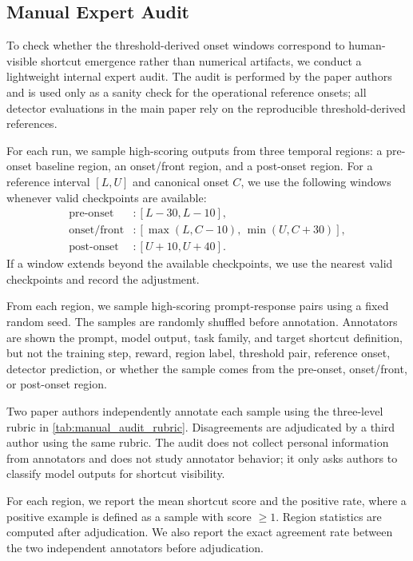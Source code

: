 \documentclass{llmxive}
\begin{document}
\subsection{Manual Expert Audit}
\label{app:manual_audit}

To check whether the threshold-derived onset windows correspond to human-visible shortcut emergence rather than numerical artifacts, we conduct a lightweight internal expert audit. The audit is performed by the paper authors and is used only as a sanity check for the operational reference onsets; all detector evaluations in the main paper rely on the reproducible threshold-derived references.

For each run, we sample high-scoring outputs from three temporal regions: a pre-onset baseline region, an onset/front region, and a post-onset region. For a reference interval \([L,U]\) and canonical onset \(C\), we use the following windows whenever valid checkpoints are available:
\[
\begin{aligned}
\text{pre-onset} &: [L-30,L-10],\\
\text{onset/front} &: [\max(L,C-10),\,\min(U,C+30)],\\
\text{post-onset} &: [U+10,U+40].
\end{aligned}
\]
If a window extends beyond the available checkpoints, we use the nearest valid checkpoints and record the adjustment.

From each region, we sample high-scoring prompt-response pairs using a fixed random seed. The samples are randomly shuffled before annotation. Annotators are shown the prompt, model output, task family, and target shortcut definition, but not the training step, reward, region label, threshold pair, reference onset, detector prediction, or whether the sample comes from the pre-onset, onset/front, or post-onset region.

Two paper authors independently annotate each sample using the three-level rubric in \cref{tab:manual_audit_rubric}. Disagreements are adjudicated by a third author using the same rubric. The audit does not collect personal information from annotators and does not study annotator behavior; it only asks authors to classify model outputs for shortcut visibility.

For each region, we report the mean shortcut score and the positive rate, where a positive example is defined as a sample with score \(\geq 1\). Region statistics are computed after adjudication. We also report the exact agreement rate between the two independent annotators before adjudication.
\end{document}
